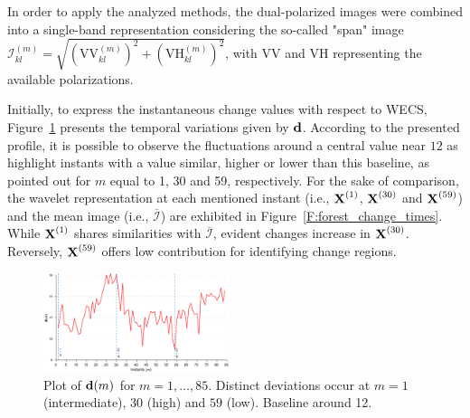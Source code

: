 \documentclass[journal]{IEEEtran}
\newcommand{\vd}{{\textbf d}}
\newcommand{\vX}{{\textbf X}}
\begin{document}
In order to apply the analyzed methods, the dual-polarized images were combined into a single-band representation considering the so-called "span" image
$\mathcal{I}_{kl}^{(m)} = \sqrt{(\mathrm{VV}_{kl}^{(m)})^2+(\mathrm{VH}_{kl}^{(m)})^2}$, with $\mathrm{VV}$ and $\mathrm{VH}$ representing the available polarizations.


Initially, to express the instantaneous change values with respect to WECS,
Figure~\ref{F:forest_wecs} presents the temporal variations given by $\vd$. According to the presented profile, it is possible to observe the fluctuations around a central value near $12$ as highlight instants with a value similar, higher or lower than this baseline, as pointed out for $m$ equal to 1, 30 and 59, respectively.
%
For the sake of comparison, the wavelet representation at each mentioned instant (i.e., $\vX^{(1)}$, $\vX^{(30)}$ and $\vX^{(59)}$) and the mean image (i.e., $\overline{\mathcal{I}}$) are exhibited in Figure~\ref{F:forest_change_times}. While $\vX^{(1)}$ shares similarities with $\overline{\mathcal{I}}$, evident changes increase in $\vX^{(30)}$. Reversely, $\vX^{(59)}$ offers low contribution for identifying change regions.



\begin{figure}[htb!]
\centering
\includegraphics[width=0.485\textwidth]{../../graphs/LineInstants_1-30-59.pdf}
\caption{Plot of $\vd(m)$ for $m=1,\ldots,85$. Distinct deviations occur at $m=1$ (intermediate), $30$ (high) and $59$ (low). Baseline around 12.}\label{F:forest_wecs}
\end{figure}
\end{document}

